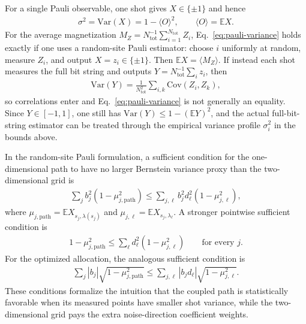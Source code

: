 \documentclass[aps,pra,reprint,groupedaddress,floatfix]{revtex4-2}
\newcommand{\mb}{\mathbb}
\begin{document}
For a single Pauli observable, one shot gives $X\in\{\pm1\}$ and hence
\begin{align}
\label{eq:pauli-variance}
    \sigma^2=\mathrm{Var}(X)=1-\langle O \rangle^2,
    \qquad
    \langle O \rangle=\mb E X.
\end{align}
For the average magnetization $M_Z=N_{\mathrm{tot}}^{-1}\sum_{i=1}^{N_{\mathrm{tot}}}Z_i$, Eq.~\eqref{eq:pauli-variance} holds exactly if one uses a random-site Pauli estimator: choose $i$ uniformly at random, measure $Z_i$, and output $X=z_i\in\{\pm1\}$. Then $\mb E X=\langle M_Z\rangle$. If instead each shot measures the full bit string and outputs $Y=N_{\mathrm{tot}}^{-1}\sum_i z_i$, then
\begin{align*}
    \mathrm{Var}(Y)
    =
    \frac{1}{N_{\mathrm{tot}}^2}\sum_{i,k}\mathrm{Cov}(Z_i,Z_k),
\end{align*}
so correlations enter and Eq.~\eqref{eq:pauli-variance} is not generally an equality. Since $Y\in[-1,1]$, one still has $\mathrm{Var}(Y)\le 1-(\mb E Y)^2$, and the actual full-bit-string estimator can be treated through the empirical variance profile $\sigma_i^2$ in the bounds above.

In the random-site Pauli formulation, a sufficient condition for the one-dimensional path to have no larger Bernstein variance proxy than the two-dimensional grid is
\begin{align}
\label{eq:variance-proxy-condition-equal}
    \sum_j b_j^2\left(1-\mu_{j,\mathrm{path}}^2\right)
    \le
    \sum_{j,\ell}b_j^2d_\ell^2\left(1-\mu_{j,\ell}^2\right),
\end{align}
where $\mu_{j,\mathrm{path}}=\mb E X_{s_j,\lambda(s_j)}$ and $\mu_{j,\ell}=\mb E X_{s_j,\lambda_\ell}$. A stronger pointwise sufficient condition is
\begin{align}
\label{eq:variance-proxy-condition-pointwise}
    1-\mu_{j,\mathrm{path}}^2
    \le
    \sum_\ell d_\ell^2\left(1-\mu_{j,\ell}^2\right)
    \qquad \text{for every } j.
\end{align}
For the optimized allocation, the analogous sufficient condition is
\begin{align}
\label{eq:variance-proxy-condition-opt}
    \sum_j |b_j|\sqrt{1-\mu_{j,\mathrm{path}}^2}
    \le
    \sum_{j,\ell}|b_jd_\ell|\sqrt{1-\mu_{j,\ell}^2}.
\end{align}
These conditions formalize the intuition that the coupled path is statistically favorable when its measured points have smaller shot variance, while the two-dimensional grid pays the extra noise-direction coefficient weights.
\end{document}
